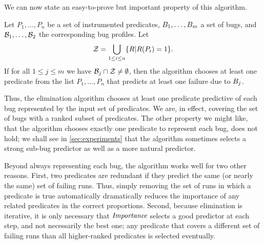 We can now state an easy-to-prove but important property of this algorithm.
\begin{lemma}
Let $P_1,\ldots,P_n$ be a set of instrumented predicates, $B_1,\ldots,B_m$
a set of bugs, and $\mathcal{B}_1,\ldots, \mathcal{B}_2$ the corresponding
bug profiles.  Let
\[ {\cal Z} = \bigcup_{1 \leq i \leq n} \{ R | \report{P_i} = 1 \} . \]
If for all $1 \leq j \leq m$ we have $\bugprofile_j \cap {\cal Z} \neq \emptyset$, then
the algorithm chooses at least one predicate from the list $P_1,\ldots,P_n$ that predicts
at least one failure due to $B_j$.
\end{lemma}

Thus, the elimination algorithm chooses at least one predicate
predictive of each bug represented by the input set of predicates.
We are, in effect, covering the set of bugs with a ranked subset of predicates.
The other property we might like, that the algorithm chooses exactly
one predicate to represent each bug, does not hold; we shall see in
\autoref{sec:experiments} that the algorithm sometimes selects a
strong sub-bug predictor as well as a more natural predictor.

Beyond
always representing each bug, the algorithm works well for two other
reasons.  First, two predicates are redundant if they predict the same
(or nearly the same) set of failing runs.  Thus, simply removing the
set of runs in which a predicate is true automatically dramatically
reduces the importance of any related predicates in the correct
proportions. Second, because elimination is
iterative, it is only necessary that $\textit{Importance}$ selects a good
predictor at each step, and not necessarily the best one; any
predicate that covers a different set of failing runs than all
higher-ranked predicates is selected eventually.

